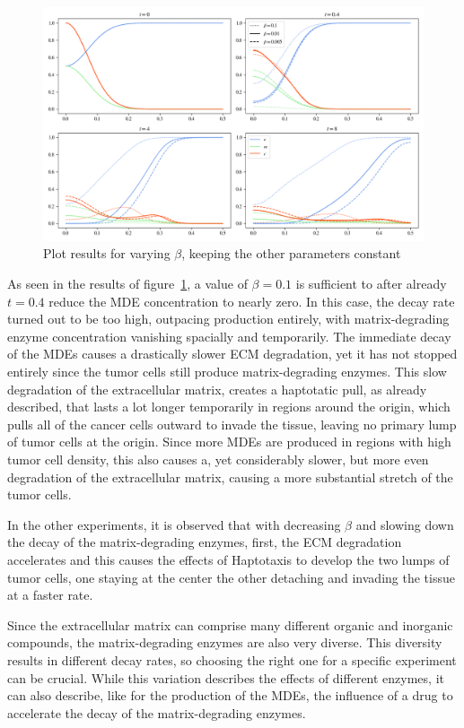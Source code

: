 \begin{figure}[h]
 \centering
 \includegraphics[width=\textwidth]{resources/images/beta_variation.png}
 \caption{Plot results for varying $\beta$, keeping the other parameters constant}
 \label{fig:beta_variation}
\end{figure}
As seen in the results of figure~\ref{fig:beta_variation}, a value of $\beta=0.1$ is sufficient to after already $t=0.4$ reduce the MDE concentration to nearly zero. In this case, the decay rate turned out to be too high, outpacing production entirely, with matrix-degrading enzyme concentration vanishing spacially and temporarily. The immediate decay of the MDEs causes a drastically slower ECM degradation, yet it has not stopped entirely since the tumor cells still produce matrix-degrading enzymes. This slow degradation of the extracellular matrix, creates a haptotatic pull, as already described, that lasts a lot longer temporarily in regions around the origin, which pulls all of the cancer cells outward to invade the tissue, leaving no primary lump of tumor cells at the origin. Since more MDEs are produced in regions with high tumor cell density, this also causes a, yet considerably slower, but more even degradation of the extracellular matrix, causing a more substantial stretch of the tumor cells.

In the other experiments, it is observed that with decreasing $\beta$ and slowing down the decay of the matrix-degrading enzymes, first, the ECM degradation accelerates and this causes the effects of Haptotaxis to develop the two lumps of tumor cells, one staying at the center the other detaching and invading the tissue at a faster rate.

Since the extracellular matrix can comprise many different organic and inorganic compounds, the matrix-degrading enzymes are also very diverse. This diversity results in different decay rates, so choosing the right one for a specific experiment can be crucial. While this variation describes the effects of different enzymes, it can also describe, like for the production of the MDEs, the influence of a drug to accelerate the decay of the matrix-degrading enzymes.

